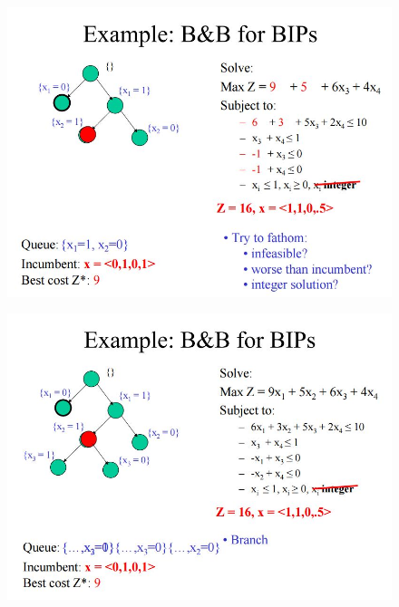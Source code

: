 \documentclass{beamer}
\begin{document}
\begin{frame}
	\begin{figure}
		\centering
		\includegraphics[width=1.0\linewidth]{BB-BIP/BB-BIP17}
	\end{figure}
\end{frame}
\begin{frame}
	\begin{figure}
		\centering
		\includegraphics[width=1.0\linewidth]{BB-BIP/BB-BIP18}
	\end{figure}
\end{frame}
\end{document}
